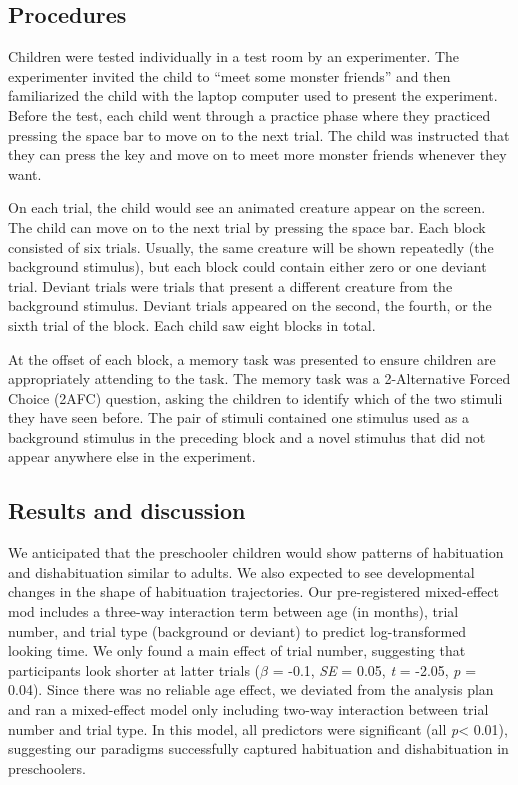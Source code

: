 \documentclass[10pt, letterpaper]{article}
\begin{document}
\hypertarget{procedures}{%
\subsection{Procedures}\label{procedures}}

Children were tested individually in a test room by an experimenter. The
experimenter invited the child to ``meet some monster friends'' and then
familiarized the child with the laptop computer used to present the
experiment. Before the test, each child went through a practice phase
where they practiced pressing the space bar to move on to the next
trial. The child was instructed that they can press the key and move on
to meet more monster friends whenever they want.

On each trial, the child would see an animated creature appear on the
screen. The child can move on to the next trial by pressing the space
bar. Each block consisted of six trials. Usually, the same creature will
be shown repeatedly (the background stimulus), but each block could
contain either zero or one deviant trial. Deviant trials were trials
that present a different creature from the background stimulus. Deviant
trials appeared on the second, the fourth, or the sixth trial of the
block. Each child saw eight blocks in total.

At the offset of each block, a memory task was presented to ensure
children are appropriately attending to the task. The memory task was a
2-Alternative Forced Choice (2AFC) question, asking the children to
identify which of the two stimuli they have seen before. The pair of
stimuli contained one stimulus used as a background stimulus in the
preceding block and a novel stimulus that did not appear anywhere else
in the experiment.

\hypertarget{results-and-discussion}{%
\subsection{Results and discussion}\label{results-and-discussion}}

We anticipated that the preschooler children would show patterns of
habituation and dishabituation similar to adults. We also expected to
see developmental changes in the shape of habituation trajectories. Our
pre-registered mixed-effect mod includes a three-way interaction term
between age (in months), trial number, and trial type (background or
deviant) to predict log-transformed looking time. We only found a main
effect of trial number, suggesting that participants look shorter at
latter trials (\(\beta\) = -0.1, \emph{SE} = 0.05, \emph{t} = -2.05,
\emph{p} = 0.04). Since there was no reliable age effect, we deviated
from the analysis plan and ran a mixed-effect model only including
two-way interaction between trial number and trial type. In this model,
all predictors were significant (all \emph{p}\textless{} 0.01),
suggesting our paradigms successfully captured habituation and
dishabituation in preschoolers.
\end{document}

